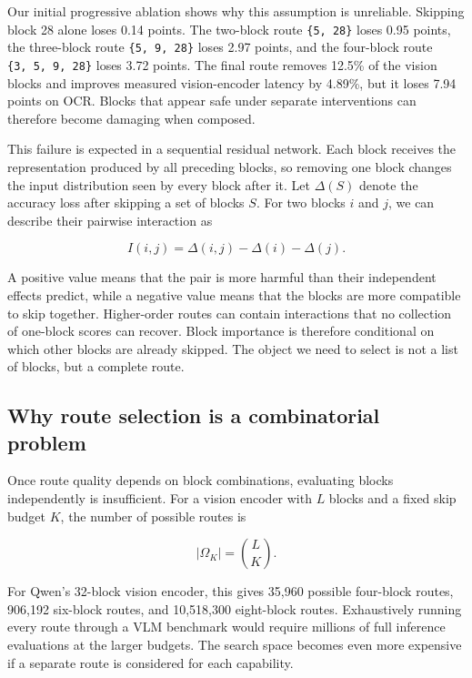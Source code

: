 \documentclass[10pt]{article}
\begin{document}
Our initial progressive ablation shows why this assumption is
unreliable. Skipping block 28 alone loses 0.14 points. The two-block
route \texttt{\{5,\ 28\}} loses 0.95 points, the three-block route
\texttt{\{5,\ 9,\ 28\}} loses 2.97 points, and the four-block route
\texttt{\{3,\ 5,\ 9,\ 28\}} loses 3.72 points. The final route removes
12.5\% of the vision blocks and improves measured vision-encoder latency
by 4.89\%, but it loses 7.94 points on OCR. Blocks that appear safe
under separate interventions can therefore become damaging when
composed.

This failure is expected in a sequential residual network. Each block
receives the representation produced by all preceding blocks, so
removing one block changes the input distribution seen by every block
after it. Let \(\Delta(S)\) denote the accuracy loss after skipping a
set of blocks \(S\). For two blocks \(i\) and \(j\), we can describe
their pairwise interaction as

\[
I(i,j) = \Delta(i,j) - \Delta(i) - \Delta(j).
\]

A positive value means that the pair is more harmful than their
independent effects predict, while a negative value means that the
blocks are more compatible to skip together. Higher-order routes can
contain interactions that no collection of one-block scores can recover.
Block importance is therefore conditional on which other blocks are
already skipped. The object we need to select is not a list of blocks,
but a complete route.

\subsection{Why route selection is a combinatorial problem}\label{why-route-selection-is-a-combinatorial-problem}

Once route quality depends on block combinations, evaluating blocks
independently is insufficient. For a vision encoder with \(L\) blocks
and a fixed skip budget \(K\), the number of possible routes is

\[
|\Omega_K| = \binom{L}{K}.
\]

For Qwen's 32-block vision encoder, this gives 35,960 possible
four-block routes, 906,192 six-block routes, and 10,518,300 eight-block
routes. Exhaustively running every route through a VLM benchmark would
require millions of full inference evaluations at the larger budgets.
The search space becomes even more expensive if a separate route is
considered for each capability.
\end{document}
